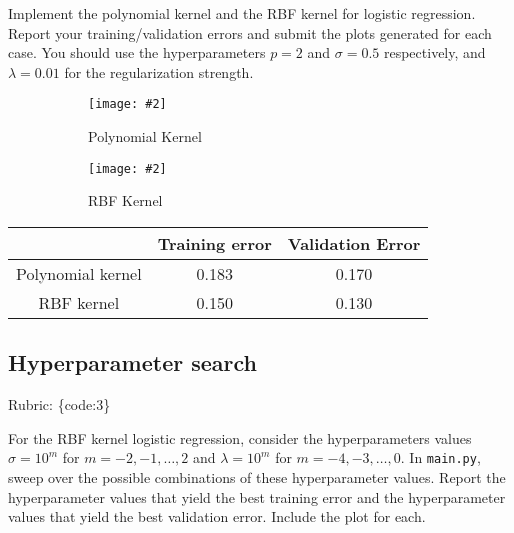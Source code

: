 \documentclass{article}
\def\rubric#1{\gre{Rubric: \{#1\}}}{}
\def\blu#1{{\color{blu}#1}}
\def\gre#1{{\color{gre}#1}}
\def\ans#1{{\color{ans}#1}}
\newcommand{\centerfig}[2]{\begin{center}\texttt{[image: \#2]}\end{center}}
\begin{document}
 \blu{Implement the polynomial kernel and the RBF kernel for logistic regression. Report your training/validation errors and submit the plots generated for each case}. You should use the hyperparameters $p=2$ and $\sigma=0.5$ respectively, and $\lambda=0.01$ for the regularization strength.
 \ans{
    \begin{center}
        
    \end{center}
    \begin{figure}[htp]
        \begin{subfigure}[b]{0.5\textwidth} \color{ans}
            \centerfig{1.0}{../figs/logRegPolynomialKernel.png}
            {
              \begin{center}
                 Polynomial Kernel
              \end{center}
            }
          \label{fig:1}
        \end{subfigure}
        \begin{subfigure}[b]{0.5\textwidth} \color{ans}
            \centerfig{1.0}{../figs/logRegRBFKernel.png}
           {
               \begin{center}
                RBF Kernel
               \end{center}
           }
          \label{fig:2}
        \end{subfigure}
    \end{figure}
    \scriptsize
    \setlength{\tabcolsep}{2pt}
    \begin{center}
    \begin{tabular}{SSS} \toprule
       {} & {Training error} & {Validation Error} \\ \midrule
       {Polynomial kernel} & 0.183 & 0.170 \\ \midrule
       {RBF kernel} & 0.150 & 0.130 \\ \bottomrule
    \end{tabular}
    \end{center}
    \normalsize
 }
 \clearpage
\subsection{Hyperparameter search}
\rubric{code:3}

For the RBF kernel logistic regression, consider the hyperparameters values $\sigma=10^m$ for $m=-2,-1,\ldots,2$ and $\lambda=10^m$ for $m=-4,-3,\ldots,0$. \blu{In \texttt{main.py}, sweep over the possible combinations of these hyperparameter values. Report the hyperparameter values that yield the best training error and the hyperparameter values that yield the best validation error. Include the plot for each.}
\end{document}
